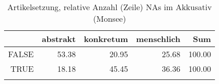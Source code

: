 \begin{table}[ht]
\centering
\begin{tabular}{rrrrr}
  \lsptoprule
 & abstrakt & konkretum & menschlich & Sum \\ 
  \midrule
FALSE & 53.38 & 20.95 & 25.68 & 100.00 \\ 
  TRUE & 18.18 & 45.45 & 36.36 & 100.00 \\ 
   \lspbottomrule
\end{tabular}
\caption{Artikelsetzung, relative Anzahl (Zeile) NAs im Akkusativ (Monsee)} 
\end{table}

